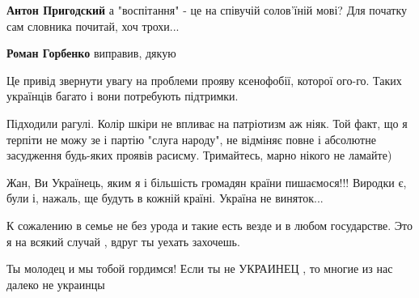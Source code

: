\begin{itemize}
\begin{itemize}
\textbf{Антон Пригодский} а "воспітання" - це на співучій солов'їній мові? Для початку сам словника почитай, хоч трохи...

 
\textbf{Роман Горбенко} виправив, дякую
\end{itemize}

 
Це привід звернути увагу на проблеми прояву ксенофобії, которої ого-го. Таких українців багато і вони потребують підтримки.

 
Підходили рагулі.
Колір шкіри не впливає на патріотизм аж ніяк.
Той факт, що я терпіти не можу зе і партію "слуга народу", не відміняє повне і абсолютне засудження будь-яких проявів расисму.
Тримайтесь, марно нікого не ламайте)

 
Жан, Ви Українець, яким я і більшість громадян країни пишаємося!!! Виродки є, були і, нажаль, ще будуть в кожній країні. Україна не виняток...

 

К сожалению в семье не без урода и такие есть везде и в любом государстве. Это
я на всякий случай , вдруг ты уехать захочешь.

Ты молодец и мы тобой гордимся! Если ты не УКРАИНЕЦ , то многие из нас далеко
не украинцы


\end{itemize}
